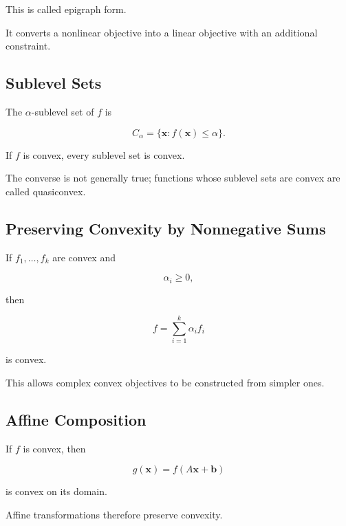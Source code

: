 This is called epigraph form.

It converts a nonlinear objective into a linear objective with an
additional constraint.

\subsection{Sublevel Sets}
\label{subsec:sublevel-sets}

The \(\alpha\)-sublevel set of \(f\) is

\[
\boxed{
C_\alpha
=
\{
\mathbf{x}:
f(\mathbf{x})\leq\alpha
\}.
}
\]

If \(f\) is convex, every sublevel set is convex.

The converse is not generally true; functions whose sublevel sets are
convex are called quasiconvex.

\subsection{Preserving Convexity by Nonnegative Sums}
\label{subsec:convex-nonnegative-sums}

If \(f_1,\ldots,f_k\) are convex and

\[
\alpha_i\geq0,
\]

then

\[
\boxed{
f
=
\sum_{i=1}^{k}
\alpha_if_i
}
\]

is convex.

This allows complex convex objectives to be constructed from simpler
ones.

\subsection{Affine Composition}
\label{subsec:convex-affine-composition}

If \(f\) is convex, then

\[
\boxed{
g(\mathbf{x})
=
f(A\mathbf{x}+\mathbf{b})
}
\]

is convex on its domain.

Affine transformations therefore preserve convexity.

